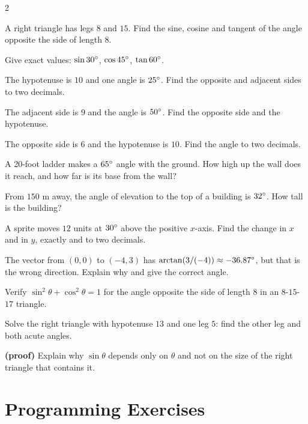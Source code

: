 \begin{multicols}{2}
\begin{exercises}
\item A right triangle has legs $8$ and $15$. Find the sine, cosine and tangent of the angle opposite the side of length $8$.
\item Give exact values: $\sin 30^\circ$, $\cos 45^\circ$, $\tan 60^\circ$.
\item The hypotenuse is $10$ and one angle is $25^\circ$. Find the opposite and adjacent sides to two decimals.
\item The adjacent side is $9$ and the angle is $50^\circ$. Find the opposite side and the hypotenuse.
\item The opposite side is $6$ and the hypotenuse is $10$. Find the angle to two decimals.
\item A 20-foot ladder makes a $65^\circ$ angle with the ground. How high up the wall does it reach, and how far is its base from the wall?
\item From $150$ m away, the angle of elevation to the top of a building is $32^\circ$. How tall is the building?
\item A sprite moves $12$ units at $30^\circ$ above the positive $x$-axis. Find the change in $x$ and in $y$, exactly and to two decimals.
\item The vector from $(0, 0)$ to $(-4, 3)$ has $\arctan(3/(-4)) \approx -36.87^\circ$, but that is the wrong direction. Explain why and give the correct angle.
\item Verify $\sin^2\theta + \cos^2\theta = 1$ for the angle opposite the side of length $8$ in an $8$-$15$-$17$ triangle.
\item Solve the right triangle with hypotenuse $13$ and one leg $5$: find the other leg and both acute angles.
\item \textbf{(proof)} Explain why $\sin\theta$ depends only on $\theta$ and not on the size of the right triangle that contains it.
\end{exercises}
\end{multicols}

\section{Programming Exercises}

